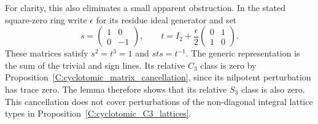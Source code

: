 For clarity, this also eliminates a small apparent obstruction.
In the stated square-zero ring write $\epsilon$ for its residue
ideal generator and set
\[
 s=\begin{pmatrix}1&0\\0&-1\end{pmatrix},\qquad
 t=I_2+\frac{\epsilon}{2}
          \begin{pmatrix}0&1\\1&0\end{pmatrix}.
\]
These matrices satisfy $s^2=t^3=1$ and $sts=t^{-1}$.
The generic representation is the sum of the trivial and sign
lines. Its relative $C_3$ class is zero by
Proposition~\ref{C:cyclotomic_matrix_cancellation}, since its
nilpotent perturbation has trace zero. The lemma therefore shows
that its relative $S_3$ class is also zero. This cancellation
does not cover perturbations of the non-diagonal integral
lattice types in Proposition~\ref{C:cyclotomic_C3_lattices}.
